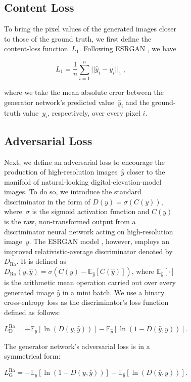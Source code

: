 \documentclass[tc, noline]{copernicus}
\begin{document}
\begin{figure}[t]
\begin{figure}[t]
\subsection{Content Loss}

To bring the pixel values of the generated images closer to those of the ground truth, we first define the content-loss function~$L_1$.
Following ESRGAN \citep{WangESRGANEnhancedSuperResolution2019}, we have

\begin{equation}\label{eq:A1}
  L_1 = \dfrac{1}{n} \sum\limits_{i=1}^n ||\hat{y}_i - y_i||_{1}~,
\end{equation}

where we take the mean absolute error between the generator network's predicted value~$\hat{y}_i$ and the ground-truth value~$y_i$, respectively, over every pixel $i$.

\subsection{Adversarial Loss}

Next, we define an adversarial loss to encourage the production of high-resolution images~$\hat{y}$ closer to the manifold of natural-looking digital-elevation-model images.
To do so, we introduce the standard discriminator in the form of $D(y) = \sigma(C(y))$, where~$\sigma$ is the sigmoid activation function and $C(y)$ is the raw, non-transformed output from a discriminator neural network acting on high-resolution image~$y$.
The ESRGAN model \citep{WangESRGANEnhancedSuperResolution2019}, however, employs an improved relativistic-average discriminator \citep{Jolicoeur-Martineaurelativisticdiscriminatorkey2018} denoted by~$D_{\text{Ra}}$.
It is defined as $D_{\text{Ra}}(y,\hat{y}) = \sigma(C(y) - \mathbb{E}_{\hat{y}}[C(\hat{y})])$, where $\mathbb{E}_{\hat{y}}[\cdot]$ is the arithmetic mean operation carried out over every generated image $\hat{y}$ in a mini batch.
We use a binary cross-entropy loss as the discriminator's loss function defined as follows:

\begin{equation}\label{eq:A2}
  L_{\mathrm{D}}^{\text{Ra}} = - \mathbb{E}_y[\ln(D(y,\hat{y}))] - \mathbb{E}_{\hat{y}}[\ln(1 - D(\hat{y},y))].
\end{equation}

The generator network's adversarial loss is in a symmetrical form:

\begin{equation}\label{eq:A3}
  L_{\mathrm{G}}^{\text{Ra}} = - \mathbb{E}_y[\ln(1 - D(y,\hat{y}))] - \mathbb{E}_{\hat{y}}[\ln(D(\hat{y},y))].
\end{equation}


\end{figure}
\end{figure}
\end{document}
